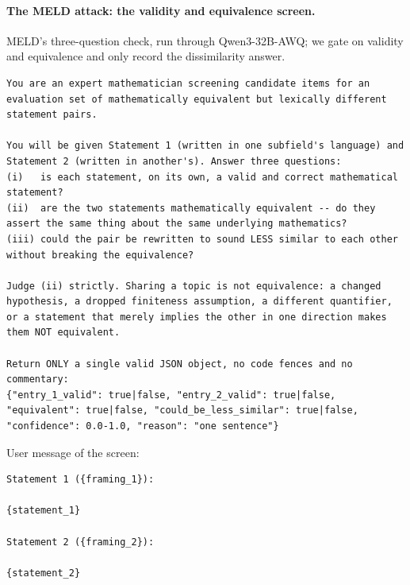 \paragraph{The MELD attack: the validity and equivalence screen.}
MELD's three-question check, run through Qwen3-32B-AWQ; we gate on validity and equivalence and only record the dissimilarity answer.
\begin{Verbatim}[breaklines=true,breakanywhere=true,fontsize=\small]
You are an expert mathematician screening candidate items for an evaluation set of mathematically equivalent but lexically different statement pairs.

You will be given Statement 1 (written in one subfield's language) and Statement 2 (written in another's). Answer three questions:
(i)   is each statement, on its own, a valid and correct mathematical statement?
(ii)  are the two statements mathematically equivalent -- do they assert the same thing about the same underlying mathematics?
(iii) could the pair be rewritten to sound LESS similar to each other without breaking the equivalence?

Judge (ii) strictly. Sharing a topic is not equivalence: a changed hypothesis, a dropped finiteness assumption, a different quantifier, or a statement that merely implies the other in one direction makes them NOT equivalent.

Return ONLY a single valid JSON object, no code fences and no commentary:
{"entry_1_valid": true|false, "entry_2_valid": true|false, "equivalent": true|false, "could_be_less_similar": true|false, "confidence": 0.0-1.0, "reason": "one sentence"}
\end{Verbatim}

User message of the screen:
\begin{Verbatim}[breaklines=true,breakanywhere=true,fontsize=\small]
Statement 1 ({framing_1}):

{statement_1}

Statement 2 ({framing_2}):

{statement_2}
\end{Verbatim}

